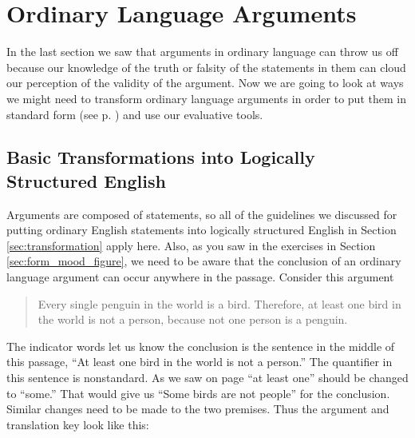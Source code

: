 
\section{Ordinary Language Arguments}

In the last section we saw that arguments in ordinary language can throw us off because our knowledge of the truth or falsity of the statements in them can cloud our perception of the validity of the argument. Now we are going to look at ways we might need to transform ordinary language arguments in order to put them in standard form (see p. \pageref{standard_form_for_an_Aristotelian_syllogism}) and use our evaluative tools.  

\subsection{Basic Transformations into Logically Structured English}

Arguments are composed of statements, so all of the guidelines we discussed for putting ordinary English statements into logically structured English in Section \ref{sec:transformation} apply here. Also, as you saw in the exercises in Section \ref{sec:form_mood_figure}, we need to be aware that the conclusion of an ordinary language argument can occur anywhere in the passage. Consider this argument

\begin{quotation}
\noindent Every single penguin in the world is a bird. Therefore, at least one bird in the world is not a person, because not one person is a penguin.
\end{quotation}

The indicator words let us know the conclusion is the sentence in the middle of this passage, ``At least one bird in the world is not a person.'' The quantifier in this sentence is nonstandard. As we saw on page \pageref{subsec:nonstandard_quantifiers} ``at least one'' should be changed to ``some.'' That would give us ``Some birds are not people'' for the conclusion. Similar changes need to be made to the two premises. Thus the argument and translation key look like this: 

